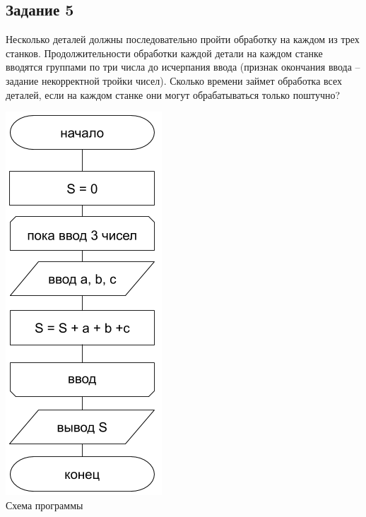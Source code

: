 \documentclass[a4paper,14pt]{extarticle}
\begin{document}
\subsection{Задание 5}
Несколько деталей должны последовательно пройти обработку на каждом из трех станков. Продолжительности обработки каждой детали на каждом станке вводятся группами по три числа до исчерпания ввода (признак окончания ввода – задание некорректной тройки чисел). Сколько времени займет обработка всех деталей, если на каждом станке они могут обрабатываться только поштучно?
\begin{center}
\includegraphics[scale=0.6]{lab2-5.png}\\
Схема программы
\end{center}

\end{document}
